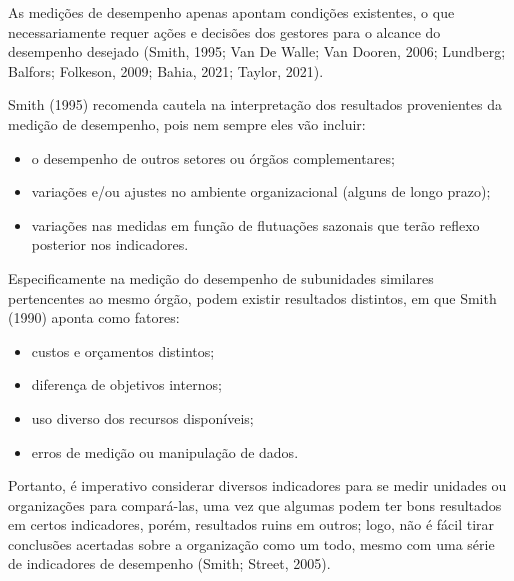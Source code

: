 \documentclass[
  letterpaper,
  DIV=11,
  numbers=noendperiod]{scrreprt}
\begin{document}
\begin{tcolorbox}[enhanced jigsaw, colframe=quarto-callout-note-color-frame, opacityback=0, toprule=.15mm, breakable, leftrule=.75mm, title=\textcolor{quarto-callout-note-color}{\faInfo}\hspace{0.5em}{Nota}, rightrule=.15mm, colbacktitle=quarto-callout-note-color!10!white, colback=white, arc=.35mm, bottomtitle=1mm, toptitle=1mm, bottomrule=.15mm, titlerule=0mm, opacitybacktitle=0.6, coltitle=black, left=2mm]

As medições de desempenho apenas apontam condições existentes, o que
necessariamente requer ações e decisões dos gestores para o alcance do
desempenho desejado (Smith, 1995; Van De Walle; Van Dooren, 2006;
Lundberg; Balfors; Folkeson, 2009; Bahia, 2021; Taylor, 2021).

\end{tcolorbox}

Smith (1995) recomenda cautela na interpretação dos resultados
provenientes da medição de desempenho, pois nem sempre eles vão incluir:

\begin{itemize}
\item
  o desempenho de outros setores ou órgãos complementares;
\item
  variações e/ou ajustes no ambiente organizacional (alguns de longo
  prazo);
\item
  variações nas medidas em função de flutuações sazonais que terão
  reflexo posterior nos indicadores.
\end{itemize}

Especificamente na medição do desempenho de subunidades similares
pertencentes ao mesmo órgão, podem existir resultados distintos, em que
Smith (1990) aponta como fatores:

\begin{itemize}
\item
  custos e orçamentos distintos;
\item
  diferença de objetivos internos;
\item
  uso diverso dos recursos disponíveis;
\item
  erros de medição ou manipulação de dados.
\end{itemize}

Portanto, é imperativo considerar diversos indicadores para se medir
unidades ou organizações para compará-las, uma vez que algumas podem ter
bons resultados em certos indicadores, porém, resultados ruins em
outros; logo, não é fácil tirar conclusões acertadas sobre a organização
como um todo, mesmo com uma série de indicadores de desempenho (Smith;
Street, 2005).
\end{document}
